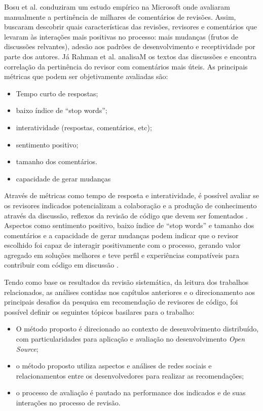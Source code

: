 \documentclass[12pt,openany,oneside,a4paper,english,brazil]{abntbibufjf}
\begin{document}
Bosu et al. \cite{bosu2015} conduziram um estudo empírico na Microsoft onde avaliaram manualmente a pertinência de milhares de comentários de revisões. Assim, buscaram descobrir quais características das revisões, revisores e comentários que levaram às interações mais positivas no processo: mais mudanças (frutos de discussões relvantes), adesão aos padrões de desenvolvimento e receptividade por parte dos autores. Já Rahman et al. \cite{rahman2017} analisaM os textos das discussões e encontra correlação da pertinência do revisor com comentários mais úteis. As principais métricas que podem ser objetivamente avaliadas são:

\begin{itemize}
  \item Tempo curto de respostas;
  \item baixo índice de ``stop words'';
  \item interatividade (respostas, comentários, etc);
  \item sentimento positivo;
  \item tamanho dos comentários.
  \item capacidade de gerar mudanças
\end{itemize}

Através de métricas como tempo de resposta e interatividade, é possível avaliar se os revisores indicados potencializam a colaboração e a produção de conhecimento através da discussão, reflexos da revisão de código que devem ser fomentados \cite{Meneely201437, Morales2015171, Bavota201581}. Aspectos como sentimento positivo, baixo índice de ``stop words'' e tamanho dos comentários e a capacidade de gerar mudanças podem indicar que o revisor escolhido foi capaz de interagir positivamente com o processo, gerando valor agregado em soluções melhores e teve perfil e experiências compatíveis para contribuir com código em discussão \cite{bosu2015}.

Tendo como base os resultados da revisão sistemática, da leitura dos trabalhos relacionados, as análises contidas nos capítulos anteriores e o direcionamento aos principais desafios da pesquisa em recomendação de revisores de código, foi possível definir os seguintes tópicos basilares para o trabalho:

\begin{itemize}
  \item O método proposto é direcionado ao contexto de desenvolvimento distribuído, com particularidades para aplicação e avaliação no desenvolvimento \textit{Open Source};
  \item o método proposto utiliza aspectos e análises de redes sociais e relacionamentos entre os desenvolvedores para realizar as recomendações;
  \item o processo de avaliação é pautado na performance dos indicados e de suas interações no processo de revisão.
\end{itemize}
\end{document}
